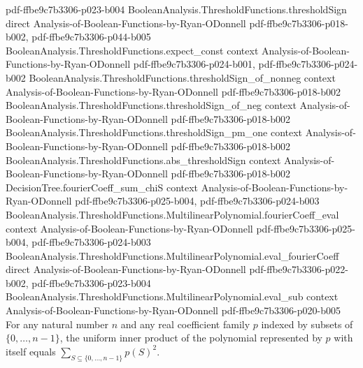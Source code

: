 \begin{lemma}
{    pdf-ffbe9c7b3306-p023-b004}
\proofstep
  {BooleanAnalysis.ThresholdFunctions.thresholdSign}
  {direct}
  {Analysis-of-Boolean-Functions-by-Ryan-ODonnell}
  {pdf-ffbe9c7b3306-p018-b002,
    pdf-ffbe9c7b3306-p044-b005}
\proofstep
  {BooleanAnalysis.ThresholdFunctions.expect_const}
  {context}
  {Analysis-of-Boolean-Functions-by-Ryan-ODonnell}
  {pdf-ffbe9c7b3306-p024-b001,
    pdf-ffbe9c7b3306-p024-b002}
\proofstep
  {BooleanAnalysis.ThresholdFunctions.thresholdSign_of_nonneg}
  {context}
  {Analysis-of-Boolean-Functions-by-Ryan-ODonnell}
  {pdf-ffbe9c7b3306-p018-b002}
\proofstep
  {BooleanAnalysis.ThresholdFunctions.thresholdSign_of_neg}
  {context}
  {Analysis-of-Boolean-Functions-by-Ryan-ODonnell}
  {pdf-ffbe9c7b3306-p018-b002}
\proofstep
  {BooleanAnalysis.ThresholdFunctions.thresholdSign_pm_one}
  {context}
  {Analysis-of-Boolean-Functions-by-Ryan-ODonnell}
  {pdf-ffbe9c7b3306-p018-b002}
\proofstep
  {BooleanAnalysis.ThresholdFunctions.abs_thresholdSign}
  {context}
  {Analysis-of-Boolean-Functions-by-Ryan-ODonnell}
  {pdf-ffbe9c7b3306-p018-b002}
\proofstep
  {DecisionTree.fourierCoeff_sum_chiS}
  {context}
  {Analysis-of-Boolean-Functions-by-Ryan-ODonnell}
  {pdf-ffbe9c7b3306-p025-b004,
    pdf-ffbe9c7b3306-p024-b003}
\proofstep
  {BooleanAnalysis.ThresholdFunctions.MultilinearPolynomial.fourierCoeff_eval}
  {context}
  {Analysis-of-Boolean-Functions-by-Ryan-ODonnell}
  {pdf-ffbe9c7b3306-p025-b004,
    pdf-ffbe9c7b3306-p024-b003}
\proofstep
  {BooleanAnalysis.ThresholdFunctions.MultilinearPolynomial.eval_fourierCoeff}
  {direct}
  {Analysis-of-Boolean-Functions-by-Ryan-ODonnell}
  {pdf-ffbe9c7b3306-p022-b002,
    pdf-ffbe9c7b3306-p023-b004}
\proofstep
  {BooleanAnalysis.ThresholdFunctions.MultilinearPolynomial.eval_sub}
  {context}
  {Analysis-of-Boolean-Functions-by-Ryan-ODonnell}
  {pdf-ffbe9c7b3306-p020-b005}
For any natural number $n$ and any real coefficient family $p$ indexed by subsets of
$\{0,\ldots,n-1\}$, the uniform inner product of the polynomial represented by $p$ with
itself equals $\sum_{S\subseteq\{0,\ldots,n-1\}}p(S)^2$.
\end{lemma}

